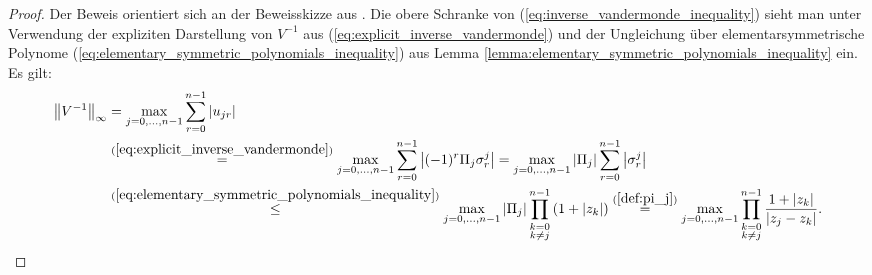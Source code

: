 \begin{proof}
    Der Beweis orientiert sich an der Beweisskizze aus
    \cite[S. 196-197]{gautschi1}.
    Die obere Schranke von (\ref{eq:inverse_vandermonde_inequality}) sieht man
    unter Verwendung der expliziten Darstellung von $V^{-1}$ aus
    (\ref{eq:explicit_inverse_vandermonde}) und der Ungleichung über
    elementarsymmetrische Polynome
    (\ref{eq:elementary_symmetric_polynomials_inequality}) aus Lemma
    \ref{lemma:elementary_symmetric_polynomials_inequality} ein.
    Es gilt:
    \begin{equation*}
        \begin{split}
            \left\lVert V^{-1} \right\rVert_{\infty}
            &= \max_{j=0, \dots, n-1} \sum_{r=0}^{n-1} \left\lvert u_{jr} \right\rvert\\
            &\overset{(\ref{eq:explicit_inverse_vandermonde})}{=}
              \max_{j=0, \dots, n-1} \sum_{r=0}^{n-1} \left\lvert (-1)^{r} \Pi_j \sigma_{r}^{j} \right\rvert
            = \max_{j=0, \dots, n-1} \left\lvert \Pi_j \right\rvert \sum_{r=0}^{n-1} \left\lvert \sigma_{r}^{j} \right\rvert\\
            &\overset{(\ref{eq:elementary_symmetric_polynomials_inequality})}{\leq}
              \max_{j=0, \dots, n-1} \left\lvert \Pi_j \right\rvert \prod_{\substack{k=0\\ k \neq j}}^{n-1} \left( 1 + \left\lvert z_k \right\rvert \right)
            \overset{(\ref{def:pi_j})}{=}
              \max_{j=0, \dots, n-1} \prod_{\substack{k=0\\ k \neq j}}^{n-1} \frac{1 + \left\lvert z_k \right\rvert}{\left\lvert z_j - z_k \right\rvert}.
        \end{split}
    \end{equation*}


\end{proof}
